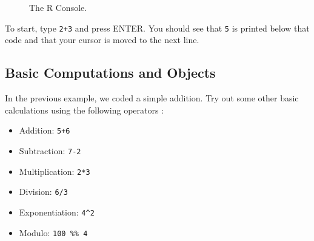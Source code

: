 \documentclass[
  letterpaper,
]{latex/krantz}
\providecommand{\tightlist}{%
  \setlength{\itemsep}{0pt}\setlength{\parskip}{0pt}}\usepackage{longtable,booktabs,array}
\begin{document}
\begin{figure}


\caption{\label{fig-r-console}The R Console.}

\end{figure}%

To start, type \texttt{2+3} and press ENTER. You should see that
\texttt{5} is printed below that code and that your cursor is moved to
the next line.

\subsection{Basic Computations and
Objects}\label{basic-computations-and-objects}

In the previous example, we coded a simple addition. Try out some other
basic calculations using the following operators :

\begin{itemize}
\tightlist
\item
  Addition: \texttt{5+6}\\
\item
  Subtraction: \texttt{7-2}\\
\item
  Multiplication: \texttt{2*3}\\
\item
  Division: \texttt{6/3}\\
\item
  Exponentiation: \texttt{4\^{}2}\\
\item
  Modulo: \texttt{100\ \%\%\ 4}
\end{itemize}
\end{document}
